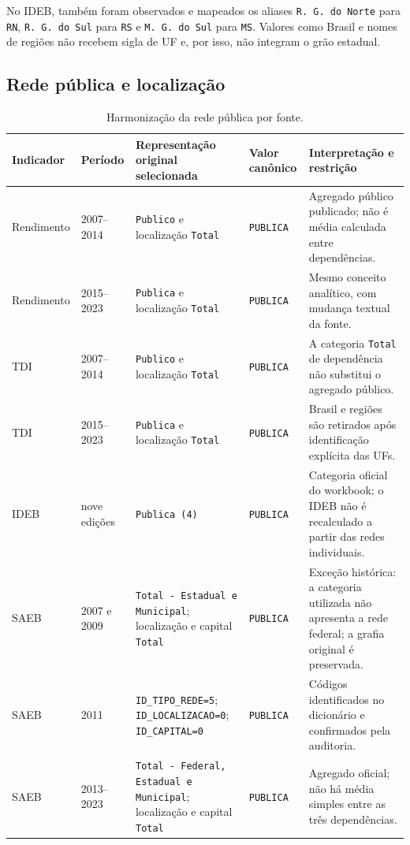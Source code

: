 No IDEB, também foram observados e mapeados os aliases \texttt{R. G. do Norte} para \texttt{RN}, \texttt{R. G. do Sul} para \texttt{RS} e \texttt{M. G. do Sul} para \texttt{MS}. Valores como Brasil e nomes de regiões não recebem sigla de UF e, por isso, não integram o grão estadual.

\begin{landscape}
\section{Rede pública e localização}

\begin{table}[H]
\centering
\scriptsize
\caption{Harmonização da rede pública por fonte.}
\label{tab:ap-rede}
\renewcommand{\arraystretch}{1.15}
\begin{tabular}{|p{3.0cm}|p{3.3cm}|p{6.0cm}|p{4.0cm}|p{6.0cm}|}
\hline
\textbf{Indicador} & \textbf{Período} & \textbf{Representação original selecionada} & \textbf{Valor canônico} & \textbf{Interpretação e restrição} \\ \hline
Rendimento & 2007--2014 & \texttt{Publico} e localização \texttt{Total} & \texttt{PUBLICA} & Agregado público publicado; não é média calculada entre dependências. \\ \hline
Rendimento & 2015--2023 & \texttt{Publica} e localização \texttt{Total} & \texttt{PUBLICA} & Mesmo conceito analítico, com mudança textual da fonte. \\ \hline
TDI & 2007--2014 & \texttt{Publico} e localização \texttt{Total} & \texttt{PUBLICA} & A categoria \texttt{Total} de dependência não substitui o agregado público. \\ \hline
TDI & 2015--2023 & \texttt{Publica} e localização \texttt{Total} & \texttt{PUBLICA} & Brasil e regiões são retirados após identificação explícita das UFs. \\ \hline
IDEB & nove edições & \texttt{Publica (4)} & \texttt{PUBLICA} & Categoria oficial do workbook; o IDEB não é recalculado a partir das redes individuais. \\ \hline
SAEB & 2007 e 2009 & \texttt{Total - Estadual e Municipal}; localização e capital \texttt{Total} & \texttt{PUBLICA} & Exceção histórica: a categoria utilizada não apresenta a rede federal; a grafia original é preservada. \\ \hline
SAEB & 2011 & \texttt{ID\_TIPO\_REDE=5}; \texttt{ID\_LOCALIZACAO=0}; \texttt{ID\_CAPITAL=0} & \texttt{PUBLICA} & Códigos identificados no dicionário e confirmados pela auditoria. \\ \hline
SAEB & 2013--2023 & \texttt{Total - Federal, Estadual e Municipal}; localização e capital \texttt{Total} & \texttt{PUBLICA} & Agregado oficial; não há média simples entre as três dependências. \\ \hline
\end{tabular}
\end{table}
\end{landscape}

